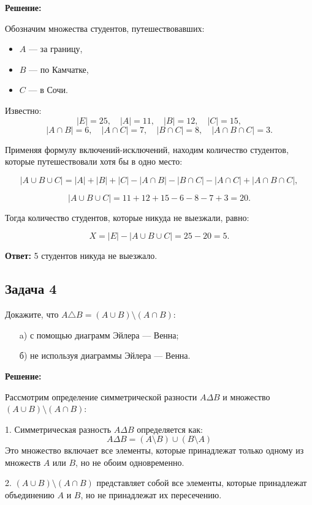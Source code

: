\documentclass[a4paper,12pt]{article}
\begin{document}
\textbf{Решение:}

Обозначим множества студентов, путешествовавших:
\begin{itemize}
    \item $A$ — за границу,
    \item $B$ — по Камчатке,
    \item $C$ — в Сочи.
\end{itemize}

Известно:
\[
|E| = 25, \quad |A| = 11, \quad |B| = 12, \quad |C| = 15,
\]
\[
|A\cap B| = 6, \quad |A \cap C| = 7, \quad |B \cap C| = 8, \quad |A \cap B \cap C| = 3.
\]

Применяя формулу включений-исключений, находим количество студентов, которые путешествовали хотя бы в одно место:

\[
|A \cup B \cup C| = |A| + |B| + |C| - |A \cap B| - |B \cap C| - |A \cap C| + |A \cap B \cap C|,
\]

\[
|A \cup B \cup C| = 11 + 12 + 15 - 6 - 8 - 7 + 3 = 20.
\]

Тогда количество студентов, которые никуда не выезжали, равно:

\[
X = |E| - |A \cup B \cup C| = 25 - 20 = 5.
\]

\textbf{Ответ:} 5 студентов никуда не выезжало.

\subsection{Задача 4}
Докажите, что \(A \triangle B = (A \cup B) \setminus (A \cap B)\):
\begin{itemize}
    \item[a)] с помощью диаграмм Эйлера — Венна;
    \item[б)] не используя диаграммы Эйлера — Венна.
\end{itemize}

\textbf{Решение:}

Рассмотрим определение симметрической разности $A \Delta B$ и множество $(A \cup B) \setminus (A \cap B)$:

1. Симметрическая разность $A \Delta B$ определяется как:
\[
A \Delta B = (A \setminus B) \cup (B \setminus A)
\]
Это множество включает все элементы, которые принадлежат только одному из множеств $A$ или $B$, но не обоим одновременно.

2. $(A \cup B) \setminus (A \cap B)$ представляет собой все элементы, которые принадлежат объединению $A$ и $B$, но не принадлежат их пересечению.
\end{document}

